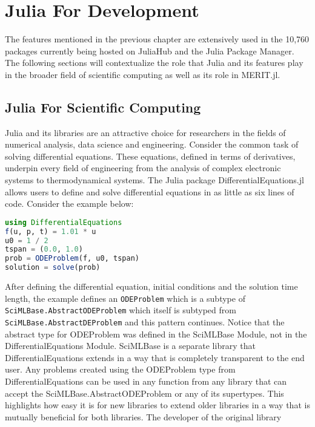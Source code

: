 \setcounter{chapter}{3}
\setcounter{section}{0}
\setcounter{subsection}{0}

\chapter*{Julia For Development}
The features mentioned in the previous chapter are extensively used in the 10,760 packages currently being hosted on
JuliaHub and the Julia Package Manager. The following sections will contextualize the role that Julia and its features
play in the broader field of scientific computing as well as its role in MERIT.jl. 

\section{Julia For Scientific Computing}
\label{JuliaScientificComputing}
Julia and its libraries are an attractive choice for researchers in the fields of numerical analysis, data science and
engineering. Consider the common task of solving differential equations. These equations, defined in terms of
derivatives, underpin every field of engineering from the analysis of complex electronic systems to thermodynamical
systems. The Julia package DifferentialEquations.jl \cite{rackauckas2017differentialequations} allows users to define
and solve differential equations in as little as six lines of code. Consider the example below:
\begin{lstlisting}[language=Julia]
using DifferentialEquations
f(u, p, t) = 1.01 * u
u0 = 1 / 2
tspan = (0.0, 1.0)
prob = ODEProblem(f, u0, tspan)
solution = solve(prob)
\end{lstlisting}
After defining the differential equation, initial conditions and the solution time length, the example defines an
\lstinline[language=Julia]{ODEProblem} which is a subtype of \lstinline[language=Julia]{SciMLBase.AbstractODEProblem} which
itself is subtyped from \lstinline[language=Julia]{SciMLBase.AbstractDEProblem} and this pattern continues. Notice that
the abstract type for ODEProblem was defined in the SciMLBase Module, not in the DifferentialEquations Module. SciMLBase
is a separate library that DifferentialEquations extends in a way that is completely transparent to the end user. Any
problems created using the ODEProblem type from DifferentialEquations can be used in any function from any library that
can accept the SciMLBase.AbstractODEProblem or any of its supertypes. This highlights how easy it is for new libraries
to extend older libraries in a way that is mutually beneficial for both libraries. The developer of the original library
